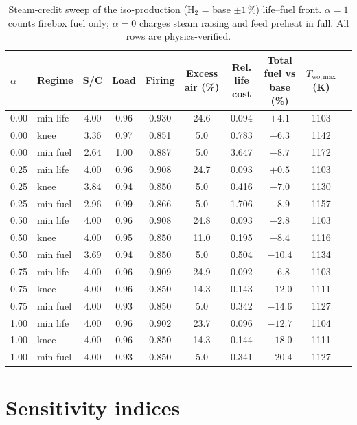 \documentclass[final,3p,times]{elsarticle}
\begin{document}
\begin{table}[h]
\centering\footnotesize
\caption{Steam-credit sweep of the iso-production (H$_2$ = base $\pm 1$\,\%) life--fuel front. $\alpha = 1$ counts firebox fuel only; $\alpha = 0$ charges steam raising and feed preheat in full. All rows are physics-verified.}
\label{tab:steam}
\begin{tabular}{llcccccccc}
\toprule
$\alpha$ & Regime & S/C & Load & Firing & Excess air (\%) & Rel. life cost & Total fuel vs base (\%) & $T_{\mathrm{wo,max}}$ (K) \\
\midrule
0.00 & min life & 4.00 & 0.96 & 0.930 & 24.6 & 0.094 & $+4.1$ & 1103 \\
0.00 & knee     & 3.36 & 0.97 & 0.851 & 5.0  & 0.783 & $-6.3$ & 1142 \\
0.00 & min fuel & 2.64 & 1.00 & 0.887 & 5.0  & 3.647 & $-8.7$ & 1172 \\
0.25 & min life & 4.00 & 0.96 & 0.908 & 24.7 & 0.093 & $+0.5$ & 1103 \\
0.25 & knee     & 3.84 & 0.94 & 0.850 & 5.0  & 0.416 & $-7.0$ & 1130 \\
0.25 & min fuel & 2.96 & 0.99 & 0.866 & 5.0  & 1.706 & $-8.9$ & 1157 \\
0.50 & min life & 4.00 & 0.96 & 0.908 & 24.8 & 0.093 & $-2.8$ & 1103 \\
0.50 & knee     & 4.00 & 0.95 & 0.850 & 11.0 & 0.195 & $-8.4$ & 1116 \\
0.50 & min fuel & 3.69 & 0.94 & 0.850 & 5.0  & 0.504 & $-10.4$ & 1134 \\
0.75 & min life & 4.00 & 0.96 & 0.909 & 24.9 & 0.092 & $-6.8$ & 1103 \\
0.75 & knee     & 4.00 & 0.96 & 0.850 & 14.3 & 0.143 & $-12.0$ & 1111 \\
0.75 & min fuel & 4.00 & 0.93 & 0.850 & 5.0  & 0.342 & $-14.6$ & 1127 \\
1.00 & min life & 4.00 & 0.96 & 0.902 & 23.7 & 0.096 & $-12.7$ & 1104 \\
1.00 & knee     & 4.00 & 0.96 & 0.850 & 14.3 & 0.144 & $-18.0$ & 1111 \\
1.00 & min fuel & 4.00 & 0.93 & 0.850 & 5.0  & 0.341 & $-20.4$ & 1127 \\
\bottomrule
\end{tabular}
\end{table}

\section{Sensitivity indices}
\label{sec:sobolsupp}
\end{document}
